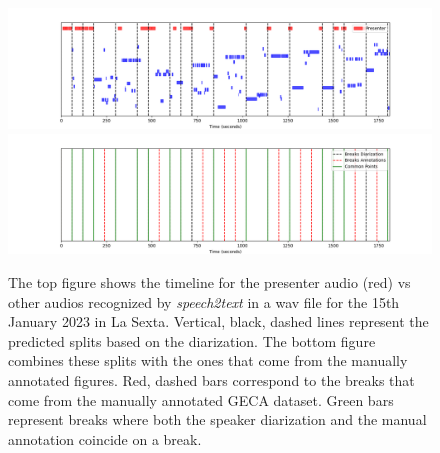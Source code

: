 \documentclass[12pt]{article}
\begin{document}
\begin{figure}[H]
	\centering
	\includegraphics[width=120mm]{figures/speakers_all}
		\includegraphics[width=120mm]{figures/speaker_timeline}
	\caption{The top figure shows the timeline for the presenter audio (red) vs other audios recognized by \textit{speech2text} in a wav file for the 15th January 2023 in La Sexta. Vertical, black, dashed lines represent the predicted splits based on the diarization. The bottom figure combines these splits with the ones that come from the manually annotated figures. Red, dashed bars correspond to the breaks that come from the manually annotated GECA dataset. Green bars represent breaks where both the speaker diarization and the manual annotation coincide on a break. }
	\label{fig:diarization}
\end{figure}




\clearpage














	
\end{document}
